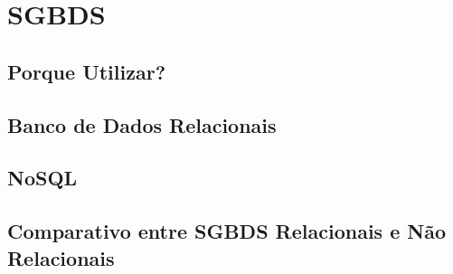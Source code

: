 \chapter{SGBDS}
\thispagestyle{empty}

\section{Porque Utilizar?}

\section{Banco de Dados Relacionais}

\section{NoSQL}

\section{Comparativo entre SGBDS Relacionais e Não Relacionais}
